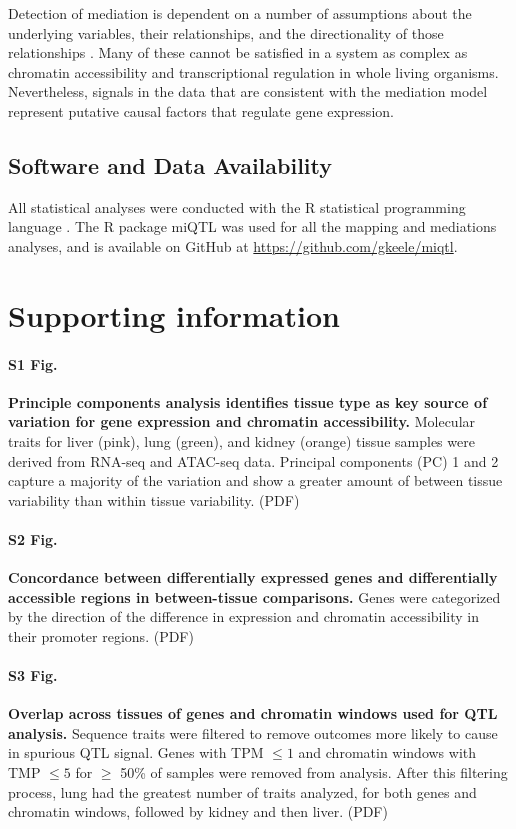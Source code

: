 \documentclass[10pt,letterpaper]{article}
\begin{document}
Detection of mediation is dependent on a number of assumptions about the underlying variables, their relationships, and the directionality of those relationships \cite{Mackinnon2007}. Many of these cannot be satisfied in a system as complex as chromatin accessibility and transcriptional regulation in whole living organisms. Nevertheless, signals in the data that are consistent with the mediation model represent putative causal factors that regulate gene expression.

\subsection*{Software and Data Availability}

All statistical analyses were conducted with the R statistical programming language \cite{RSoftware2019}. The R package miQTL was used for all the mapping and mediations analyses, and is available on GitHub at \url{https://github.com/gkeele/miqtl}.

\section*{Supporting information}

\paragraph*{S1 Fig.}
\label{S_pca}
{\bf Principle components analysis identifies tissue type as key source of variation for gene expression and chromatin accessibility.} 
Molecular traits for liver (pink), lung (green), and kidney (orange) tissue samples were derived from RNA-seq and ATAC-seq data. Principal components (PC) 1 and 2 capture a majority of the variation and show a greater amount of between tissue variability than within tissue variability. (PDF)

\paragraph*{S2 Fig.}
\label{S_de_concordance}
{\bf Concordance between differentially expressed genes and differentially accessible regions in between-tissue comparisons.} 
Genes were categorized by the direction of the difference in expression and chromatin accessibility in their promoter regions. (PDF)

\paragraph*{S3 Fig.}
\label{S_upset_outcomes}
{\bf Overlap across tissues of genes and chromatin windows used for QTL analysis.} 
Sequence traits were filtered to remove outcomes more likely to cause in spurious QTL signal. Genes with TPM $\le 1$ and chromatin windows with TMP $\le 5$ for $\ge$ 50\% of samples were removed from analysis. After this filtering process, lung had the greatest number of traits analyzed, for both genes and chromatin windows, followed by kidney and then liver. (PDF)
\end{document}
